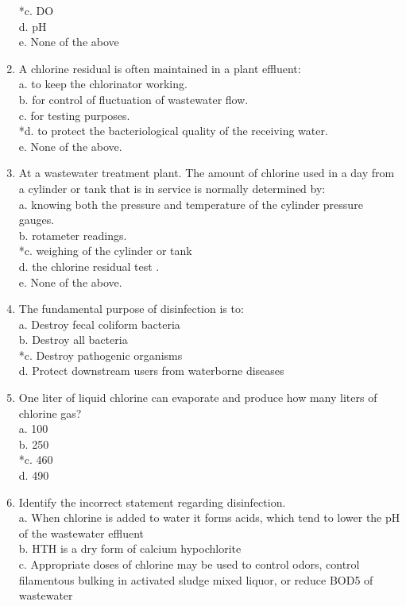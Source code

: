 \begin{enumerate}
*c. DO \\
d. pH \\
e. None of the above \\
\item A chlorine residual is often maintained in a plant effluent: \\
a. to keep the chlorinator working. \\
b. for control of fluctuation of wastewater flow. \\
c. for testing purposes. \\
*d. to protect the bacteriological quality of the receiving water. \\
e. None of the above. \\
\item At a wastewater treatment plant. The amount of chlorine used in a day from a cylinder or tank that is in service is normally determined by: \\
a. knowing both the pressure and temperature of the cylinder pressure gauges. \\
b. rotameter readings. \\
*c. weighing of the cylinder or tank \\
d. the chlorine residual test . \\
e. None of the above. \\
\item The fundamental purpose of disinfection is to: \\
a. Destroy fecal coliform bacteria \\
b. Destroy all bacteria \\
*c. Destroy pathogenic organisms \\
d. Protect downstream users from waterborne diseases \\
\item One liter of liquid chlorine can evaporate and produce how many liters of chlorine gas? \\
a. 100 \\
b. 250 \\
*c. 460 \\
d. 490 \\
\item Identify the incorrect statement regarding disinfection. \\
a. When chlorine is added to water it forms acids, which tend to lower the pH of the wastewater effluent \\
b. HTH is a dry form of calcium hypochlorite \\
c. Appropriate doses of chlorine may be used to control odors, control filamentous bulking in activated sludge mixed liquor, or reduce BOD5 of wastewater \\

\end{enumerate}
